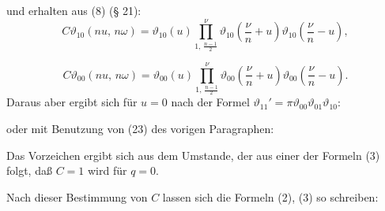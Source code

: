 und erhalten aus (8) (§ 21):
\[
C\vartheta_{10}(nu,\,n\omega) = \vartheta_{10}(u) \prod_{1,\,\frac{n-1}{2}}^{\nu} \vartheta_{10}\left(\frac{\nu}{n} + u\right)\vartheta_{10}\left(\frac{\nu}{n} - u\right),
\]


\[
C\vartheta_{00}(nu,\,n\omega) = \vartheta_{00}(u) \prod_{1,\,\frac{n-1}{2}}^{\nu} \vartheta_{00}\left(\frac{\nu}{n} + u\right)\vartheta_{00}\left(\frac{\nu}{n} - u\right).
\]
Daraus aber ergibt sich für $u = 0$ nach der Formel $\vartheta_{11}' = \pi\vartheta_{00}\vartheta_{01}\vartheta_{10}$:


oder mit Benutzung von (23) des vorigen Paragraphen:


Das Vorzeichen ergibt sich aus dem Umstande, der aus einer der Formeln (3) folgt, daß $C = 1$ wird für $q = 0$.

Nach dieser Bestimmung von $C$ lassen sich die Formeln (2), (3) so schreiben:



